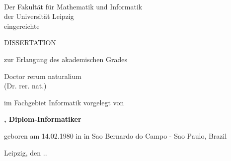 
\renewcommand{\today}{\ifnum\number\day<10 0\fi \number\day.\space%
\ifcase \month \or Januar \or Februar \or Marz \or April \or Mai %
\or Juni \or Juli \or August \or September \or Oktober \or November \or Dezember \fi %
\number \year}

\begin{titlepage}
    \begin{center}
        \large

        \hfill

        \vfill

        \begingroup
            \color{Maroon}\LARGE{\spacedallcaps{\myTitle}} \\ \bigskip
        \endgroup


        Der Fakult\"at f\"ur Mathematik und Informatik\\
        der Universit\"at Leipzig\\
        eingereichte\\ \vfill

        {\Huge DISSERTATION} \vfill\medskip

        zur Erlangung des akademischen Grades \\\vfill

        {\LARGE Doctor rerum naturalium}\\
        (Dr. rer. nat.)\\\vfill

        im Fachgebiet Informatik vorgelegt von\\\vfill

        \textbf{\myName, Diplom-Informatiker} \\\vfill

        geboren am 14.02.1980 in in Sao Bernardo do Campo - Sao Paulo, Brazil \\\vfill

        Leipzig, den \the\day.\the\month.\the\year \vfill






\end{center}
\end{titlepage}
